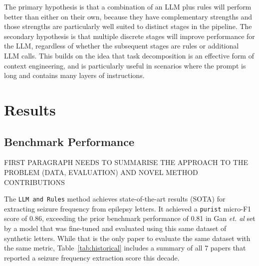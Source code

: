 \documentclass[conference]{IEEEtran}
\begin{document}
The primary hypothesis is that a combination of an LLM
plus rules will perform better than either on their own, 
because they have complementary strengths and those 
strengths are particularly well suited to distinct stages in
the pipeline. The secondary hypothesis is that multiple 
discrete stages will improve performance for the LLM,
regardless of whether the subsequent stages are rules or 
additional LLM calls. This builds on the idea that task 
decomposition is an effective form of context engineering, 
and is particularly useful in scenarios where the prompt 
is long and contains many layers of instructions. 

\section{Results}

\subsection{Benchmark Performance}

FIRST PARAGRAPH NEEDS TO SUMMARISE THE APPROACH TO THE PROBLEM (DATA, EVALUATION) AND NOVEL METHOD CONTRIBUTIONS

The \texttt{LLM and Rules} method achieves state-of-the-art results
(SOTA) for extracting seizure frequency from epilepsy letters.
It achieved a \texttt{purist} micro-F1 score of 0.86, exceeding the 
prior benchmark performance of 0.81 in Gan \emph{et. al} 
set by a model that was fine-tuned and evaluated using 
this same dataset of synthetic letters. While that is the only
paper to evaluate the same dataset with the same metric, 
Table~\ref{tab:historical} includes a summary of all 7 papers that reported 
a seizure frequency extraction score this decade.  
\end{document}
